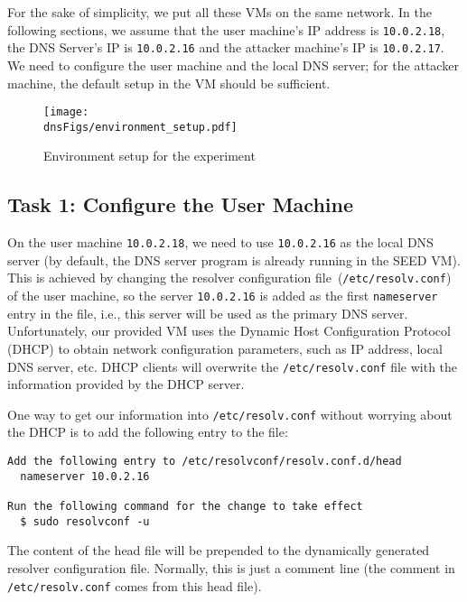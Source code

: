 For the
sake of simplicity, we put all these VMs on the same network.
In the following sections, we assume that the user machine's IP address is {\tt 10.0.2.18}, the
DNS Server's IP is {\tt 10.0.2.16} and the attacker machine's IP is {\tt 10.0.2.17}.
We need to configure the user machine and the local DNS server; for the
attacker machine, the default setup in the VM should be sufficient.

\begin{figure}[htb]
\centering
\texttt{[image: \\dnsFigs/environment\_setup.pdf]}
\caption{Environment setup for the experiment}
\label{dns:fig:environment}
\end{figure}


\subsection{Task 1: Configure the User Machine}

On the user machine {\tt 10.0.2.18}, we need to use
{\tt 10.0.2.16} as the local DNS server (by default, 
the DNS server program is already running in the SEED VM). This is achieved by changing
the resolver configuration file~(\texttt{/etc/resolv.conf}) of the user machine, 
so the server \texttt{10.0.2.16} is added as the first \texttt{nameserver} entry in the file, i.e.,
this server will be used as the primary DNS server.
Unfortunately, our provided VM uses the Dynamic Host Configuration Protocol (DHCP) to obtain
network configuration parameters, such as IP address, local DNS server, etc.
DHCP clients will overwrite the \texttt{/etc/resolv.conf} file with the information
provided by the DHCP server. 

One way to get our information into \texttt{/etc/resolv.conf} without worrying about
the DHCP is to add the following entry to the 
file:

\begin{lstlisting}
Add the following entry to /etc/resolvconf/resolv.conf.d/head
  nameserver 10.0.2.16

Run the following command for the change to take effect
  $ sudo resolvconf -u
\end{lstlisting}
 
The content of the head file will be prepended to the dynamically generated resolver
configuration file. Normally, this is just a comment line (the comment in
\texttt{/etc/resolv.conf} comes from this head file).


